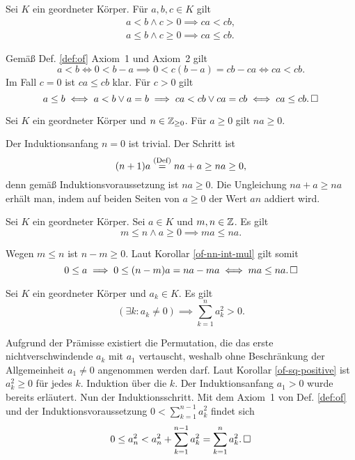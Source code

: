 \begin{Korollar}\label{of-ineq-mul}
Sei $K$ ein geordneter Körper. Für $a,b,c\in K$ gilt
\begin{gather*}
a<b\land c>0\implies ca<cb,\\
a\le b\land c\ge 0\implies ca\le cb.
\end{gather*}
\end{Korollar}
\begin{Beweis}
Gemäß Def. \ref{def:of} Axiom~1 und Axiom~2 gilt
\[a<b\iff 0<b-a \implies 0<c(b-a) = cb-ca\iff ca<cb.\]
Im Fall $c=0$ ist $ca\le cb$ klar. Für $c>0$ gilt
\[a\le b\iff a<b\lor a=b\implies ca<cb\lor ca=cb\iff ca\le cb.\,\square\]
\end{Beweis}

\begin{Korollar}\label{of-nn-int-mul}
Sei $K$ ein geordneter Körper und $n\in\mathbb Z_{\ge 0}$. Für $a\ge 0$ gilt
$na\ge 0$.
\end{Korollar}
\begin{Beweis} Der Induktionsanfang $n=0$ ist trivial. Der Schritt ist
\[(n+1)a \stackrel{\mathrm{(Def)}}{=} na+a \ge na \ge 0,\]
denn gemäß Induktionsvoraussetzung ist $na\ge 0$. Die Ungleichung
$na+a\ge na$ erhält man, indem auf beiden Seiten von
$a\ge 0$ der Wert $an$ addiert wird.\,\qedsymbol
\end{Beweis}

\begin{Korollar}
Sei $K$ ein geordneter Körper. Sei $a\in K$ und $m,n\in\mathbb Z$.
Es gilt
\[m\le n\land a\ge 0\implies ma\le na.\]
\end{Korollar}
\begin{Beweis}
Wegen $m\le n$ ist $n-m\ge 0$. Laut Korollar \ref{of-nn-int-mul}
gilt somit
\[0\le a \implies 0\le (n-m)a = na-ma\iff ma\le na.\,\square\]
\end{Beweis}

\begin{Korollar}\label{of-sum-of-sq-positive}
Sei $K$ ein geordneter Körper und $a_k\in K$. Es gilt
\[\textstyle (\exists k\colon a_k\ne 0)\implies \sum_{k=1}^n a_k^2 > 0.\]
\end{Korollar}
\begin{Beweis} Aufgrund der Prämisse existiert die Permutation, die das
erste nichtverschwindende $a_k$ mit $a_1$ vertauscht, weshalb ohne
Beschränkung der Allgemeinheit $a_1\ne 0$ angenommen werden darf.
Laut Korollar \ref{of-sq-positive} ist $a_k^2\ge 0$ für jedes $k$.
Induktion über die $k$. Der Induktionsanfang $a_1>0$ wurde bereits
erläutert. Nun der Induktionsschritt. Mit dem Axiom~1 von Def. \ref{def:of}
und der Induktionsvoraussetzung $0 < \sum_{k=1}^{n-1} a_k^2$ findet sich
\[0\le a_n^2 < a_n^2 + \sum_{k=1}^{n-1} a_k^2 = \sum_{k=1}^n a_k^2.\,\square\]
\end{Beweis}
